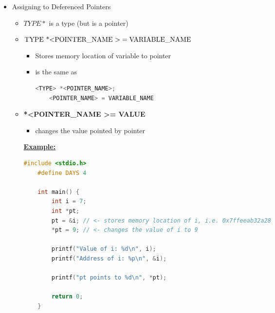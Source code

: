 \documentclass[12pt]{article}
\begin{document}
\begin{itemize}
    \item Assigning to Deferenced Pointers
    \begin{itemize}
    \item $TYPE*$ is a type (but is a pointer)
    \item \textbf{$\text{TYPE *\textless POINTER\_NAME \textgreater} = \text{VARIABLE\_NAME}$}
    \begin{itemize}
        \item Stores memory location of variable to pointer
        \item is the same as

    \begin{lstlisting}[language=c]
    <TYPE> *<POINTER_NAME>;
    <POINTER_NAME> = VARIABLE_NAME
    \end{lstlisting}

    \end{itemize}

    \item \textbf{*\textless POINTER\_NAME \textgreater = VALUE}
    \begin{itemize}
        \item changes the value pointed by pointer
    \end{itemize}

    \bigskip

    \underline{\textbf{Example:}}

    \begin{lstlisting}[language=c]
    #include <stdio.h>
    #define DAYS 4

    int main() {
        int i = 7;
        int *pt;
        pt = &i; // <- stores memory location of i, i.e. 0x7ffeeab32a28
        *pt = 9; // <- changes the value of i to 9

        printf("Value of i: %d\n", i);
        printf("Address of i: %p\n", &i);

        printf("pt points to %d\n", *pt);

        return 0;
    }
    \end{lstlisting}

    \end{itemize}
\end{itemize}
\end{document}
